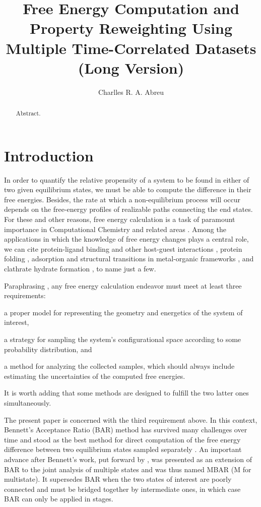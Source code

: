 \documentclass[journal=jctcce,manuscript=article]{achemso}
\author{Charlles R. A. Abreu}
\affiliation{Chemical Engineering Department, Escola de Quimica, Universidade Federal do Rio de Janeiro, Rio de Janeiro, RJ 21941-909, Brazil}
\title{Free Energy Computation and Property Reweighting Using Multiple Time-Correlated Datasets \\ (Long Version)}
\begin{document}


\begin{abstract}
Abstract.
\end{abstract}

\section{Introduction}
\label{sec:introduction}

In order to quantify the relative propensity of a system to be found in either of two given equilibrium states, we must be able to compute the difference in their free energies. Besides, the rate at which a non-equilibrium process will occur depends on the free-energy profiles of realizable paths connecting the end states. For these and other reasons, free energy calculation is a task of paramount importance in Computational Chemistry and related areas \cite{Chipot_2007, Christ_2010, Hansen_2014}. Among the applications in which the knowledge of free energy changes plays a central role, we can cite protein-ligand binding \cite{Chodera_2011, Abel_2017, Abel_2017_2, Cournia_2017, Mobley_2017} and other host-guest interactions \cite{X}, protein folding \cite{Perez_2016, X}, adsorption and structural transitions in metal-organic frameworks \cite{Coudert_2008, Bousquet_2012, Ghysels_2013, Demuynck_2017}, and clathrate hydrate formation \cite{X}, to name just a few.

Paraphrasing \citeauthor{Christ_2010} \cite{Christ_2010}, any free energy calculation endeavor must meet at least three requirements: \begin{enumerate*}[label = \arabic*)] \item a proper model for representing the geometry and energetics of the system of interest, \item a strategy for sampling the system's configurational space according to some probability distribution, and \item a method for analyzing the collected samples, which should always include estimating the uncertainties of the computed free energies.\end{enumerate*} It is worth adding that some methods are designed to fulfill the two latter ones simultaneously.

The present paper is concerned with the third requirement above. In this context, Bennett's Acceptance Ratio (BAR) method \cite{Bennett_1976} has survived many challenges over time and stood as the best method for direct computation of the free energy difference between two equilibrium states sampled separately \cite{Lu_2003, Shirts_2005}. An important advance after Bennett's work, put forward by \citeauthor{Shirts_2008} \cite{Shirts_2008}, was presented as an extension of BAR to the joint analysis of multiple states and was thus named MBAR (M for multistate). It supersedes BAR when the two states of interest are poorly connected and must be bridged together by intermediate ones, in which case BAR can only be applied in stages.
\end{document}
